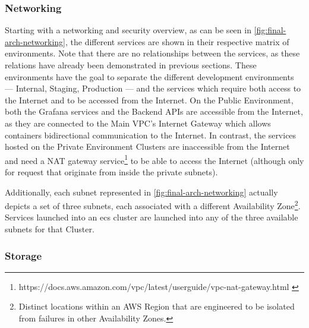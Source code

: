\subsubsection{Networking}\label{methodology:sss:final-networking}
 

Starting with a networking and security overview, as can be seen in \cref{fig:final-arch-networking}, the different services are shown in their respective matrix of environments. 
Note that there are no relationships between the services, as these relations have already been demonstrated in previous sections.
These environments have the goal to separate the different development environments --- Internal, Staging, Production --- and the services which require both access to the Internet and to be accessed from the Internet. On the Public Environment, both the Grafana services and the Backend APIs are accessible from the Internet, as they are connected to the Main VPC's Internet Gateway which allows containers bidirectional communication to the Internet. In contrast, the services hosted on the Private Environment Clusters are inaccessible from the Internet and need a NAT gateway service\footnote{https://docs.aws.amazon.com/vpc/latest/userguide/vpc-nat-gateway.html \label{foot:nat-gateway}} to be able to access the Internet (although only for request that originate from inside the private subnets).

Additionally, each subnet represented in \cref{fig:final-arch-networking} actually depicts a set of three subnets, each associated with a different Availability Zone\footnote{Distinct locations within an AWS Region that are engineered to be isolated from failures in other Availability Zones.\label{foot:aws-availability-zones}}. Services launched into an \gls{ecs} cluster are launched into any of the three available subnets for that Cluster.


\subsubsection{Storage}\label{methodology:sss:final-storage}



